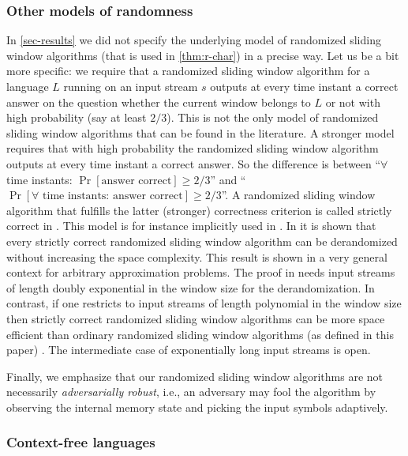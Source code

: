 \documentclass{theoretics}
\renewcommand{\geq}{\geqslant}
\begin{document}
\subsubsection{Other models of randomness}

In \cref{sec-results} we did not specify the underlying model of randomized sliding window algorithms (that is used
in \cref{thm:r-char}) in a precise way. Let us be a bit more specific: we require that a randomized sliding window 
algorithm for a language $L$ running  on an input stream $s$ outputs at every time instant a correct answer on the question whether
the current window belongs to $L$ or not with high probability (say at least $2/3$). This is not the only model of 
randomized sliding window algorithms that can be found in the literature. A stronger model requires that with high
probability the randomized sliding window algorithm outputs at every time instant a correct answer. So the difference
is between ``$\forall$ time instants: $\Pr[\text{answer correct}] \geq 2/3$'' and 
``$\Pr[\text{$\forall$ time instants: answer correct}] \geq 2/3$''. A randomized sliding window algorithm 
that fulfills the latter (stronger) correctness criterion is called strictly correct in \cite{GanardiHLTOCS21}. 
This model is for instance implicitly used in \cite{Ben-BasatEFK16,DatarGIM02}. In \cite{GanardiHLTOCS21} it is shown that every strictly correct 
 randomized sliding window algorithm can be derandomized without increasing the space complexity.
 This result is shown in a very general context for arbitrary approximation problems. 
The proof in \cite{GanardiHLTOCS21} needs input streams of length doubly exponential in the window size for the derandomization.
In contrast, if one restricts to input streams of length polynomial in the window size then strictly correct randomized sliding
window algorithms can be more space efficient than ordinary randomized sliding
window algorithms (as defined in this paper) \cite{GanardiHLTOCS21}. The intermediate case of exponentially long input streams is open.

Finally, we emphasize that our randomized sliding window algorithms are not necessarily \emph{adversarially robust}, 
i.e., an adversary may fool the algorithm by observing the internal memory state and picking the input symbols adaptively.

\subsubsection{Context-free languages} \label{sec-context-free}
\end{document}
